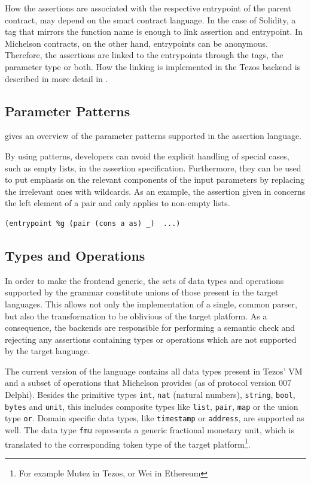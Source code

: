 How the assertions are associated with the respective entrypoint of the parent contract, may depend on the smart contract language. In the case of Solidity, a tag that mirrors the function name is enough to link assertion and entrypoint. In Michelson contracts, on the other hand, entrypoints can be anonymous. Therefore, the assertions are linked to the entrypoints through the tags, the parameter type or both. How the linking is implemented in the Tezos backend is described in more detail in .

\subsection{Parameter Patterns}
 gives an overview of the parameter patterns supported in the assertion language.

By using patterns, developers can avoid the explicit handling of special cases, such as empty lists, in the assertion specification. Furthermore, they can be used to put emphasis on the relevant components of the input parameters by replacing the irrelevant ones with wildcards. As an example, the assertion given in  concerns the left element of a pair and only applies to non-empty lists. 
\begin{lstlisting}[label=lst:patterns_usage, language=Assertion, numbers=none]
(entrypoint %g (pair (cons a as) _)  ...)
\end{lstlisting}

\subsection{Types and Operations}
In order to make the frontend generic, the sets of data types and operations supported by the grammar constitute unions of those present in the target languages. This allows not only the implementation of a single, common parser, but also the transformation to be oblivious of the target platform. As a consequence, the backends are responsible for performing a semantic check and  rejecting any assertions containing types or operations which are not supported by the target language.

The current version of the language contains all data types present in Tezos' VM and a subset of operations that Michelson provides (as of protocol version 007 Delphi). Besides the primitive types \texttt{int}, \texttt{nat} (natural numbers), \texttt{string}, \texttt{bool}, \texttt{bytes} and \texttt{unit}, this includes composite types like \texttt{list}, \texttt{pair}, \texttt{map} or the union type \texttt{or}. Domain specific data types, like \texttt{timestamp} or \texttt{address}, are supported as well. The data type \texttt{fmu} represents a generic fractional monetary unit, which is translated to the corresponding token type of the target platform\footnote{For example Mutez in Tezos, or Wei in Ethereum}.

